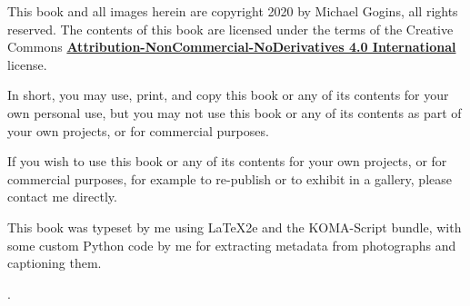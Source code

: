 \clearpage
\noindent This book and all images herein are copyright 2020 by Michael Gogins, all rights reserved. The contents of this book are licensed under the terms of the Creative Commons \href{https://creativecommons.org/licenses/by-nc-nd/4.0/legalcode}{\textbf{Attribution-NonCommercial-NoDerivatives 4.0 International} } license. 

In short, you may use, print, and copy this book or any of its contents for your own personal use, but you may not use this book or any of its contents as part of your own projects, or for commercial purposes.

If you wish to use this book or any of its contents for your own projects, or for commercial purposes, for example to re-publish or to exhibit in a gallery, please contact me directly.

This book was typeset by me using LaTeX2e and the KOMA-Script bundle, with some custom Python code by me for extracting metadata from photographs and captioning them.

.